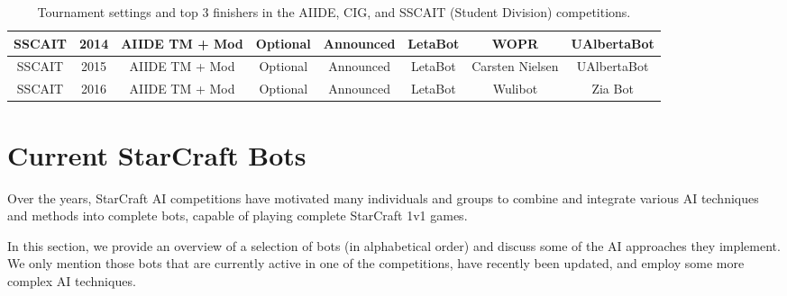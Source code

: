 \begin{table}[t]
\begin{center}
\begin{tabular} {| c | c | c c c | c c c |}
 \hline
 SSCAIT & 2014 & AIIDE TM + Mod & Optional & Announced & LetaBot & WOPR & UAlbertaBot\\
 \hline
 SSCAIT & 2015 & AIIDE TM + Mod & Optional & Announced & LetaBot & Carsten Nielsen & UAlbertaBot \\
 \hline
 SSCAIT & 2016 & AIIDE TM + Mod & Optional & Announced & LetaBot & Wulibot & Zia Bot\\
 \hline
 \end{tabular}
 \end{center}  
 \caption{Tournament settings and top 3 finishers in the AIIDE, CIG, and SSCAIT (Student Division) competitions.}
 \label{tableTournaments}
\end{table} 

\section{Current StarCraft Bots}\label{secBots}

Over the years, StarCraft AI competitions have motivated many individuals and groups to combine and integrate various AI techniques and methods into complete bots, capable of playing complete StarCraft 1v1 games. 

In this section, we provide an overview of a selection of bots (in alphabetical order) and discuss some of the AI approaches they implement. We only mention those bots that are currently active in one of the competitions, have recently been updated, and employ some more complex AI techniques. 

